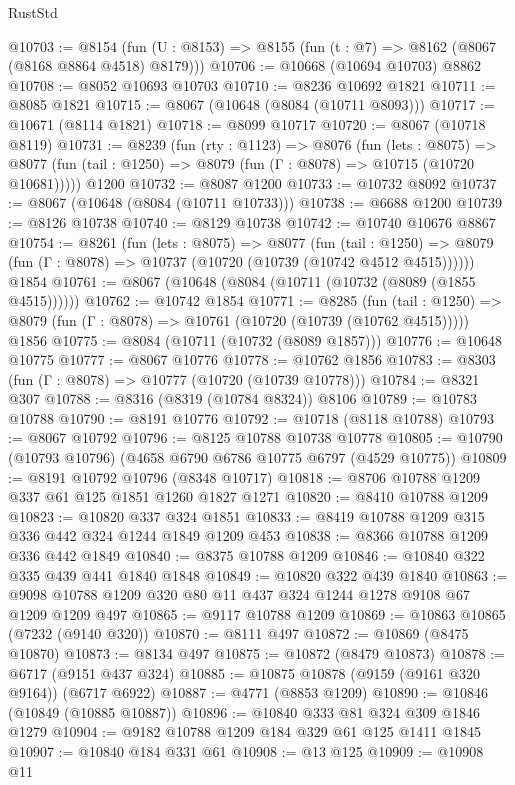 \begin{lexlean}{RustStd}
\begin{coremodule}
@10703 := @8154 (fun (U : @8153) => @8155 (fun (t : @7) => @8162 (@8067 (@8168 @8864 @4518) @8179)))
@10706 := @10668 (@10694 @10703) @8862
@10708 := @8052 @10693 @10703
@10710 := @8236 @10692 @1821
@10711 := @8085 @1821
@10715 := @8067 (@10648 (@8084 (@10711 @8093)))
@10717 := @10671 (@8114 @1821)
@10718 := @8099 @10717
@10720 := @8067 (@10718 @8119)
@10731 := @8239
    (fun (rty : @1123) =>
    @8076
      (fun (lets : @8075) =>
      @8077 (fun (tail : @1250) => @8079 (fun (Γ : @8078) => @10715 (@10720 @10681)))))
    @1200
@10732 := @8087 @1200
@10733 := @10732 @8092
@10737 := @8067 (@10648 (@8084 (@10711 @10733)))
@10738 := @6688 @1200
@10739 := @8126 @10738
@10740 := @8129 @10738
@10742 := @10740 @10676 @8867
@10754 := @8261
    (fun (lets : @8075) =>
    @8077
      (fun (tail : @1250) =>
      @8079 (fun (Γ : @8078) => @10737 (@10720 (@10739 (@10742 @4512 @4515))))))
    @1854
@10761 := @8067 (@10648 (@8084 (@10711 (@10732 (@8089 (@1855 @4515))))))
@10762 := @10742 @1854
@10771 := @8285
    (fun (tail : @1250) => @8079 (fun (Γ : @8078) => @10761 (@10720 (@10739 (@10762 @4515)))))
    @1856
@10775 := @8084 (@10711 (@10732 (@8089 @1857)))
@10776 := @10648 @10775
@10777 := @8067 @10776
@10778 := @10762 @1856
@10783 := @8303 (fun (Γ : @8078) => @10777 (@10720 (@10739 @10778)))
@10784 := @8321 @307
@10788 := @8316 (@8319 (@10784 @8324)) @8106
@10789 := @10783 @10788
@10790 := @8191 @10776
@10792 := @10718 (@8118 @10788)
@10793 := @8067 @10792
@10796 := @8125 @10788 @10738 @10778
@10805 := @10790 (@10793 @10796) (@4658 @6790 @6786 @10775 @6797 (@4529 @10775))
@10809 := @8191 @10792 @10796 (@8348 @10717)
@10818 := @8706 @10788 @1209 @337 @61 @125 @1851 @1260 @1827 @1271
@10820 := @8410 @10788 @1209
@10823 := @10820 @337 @324 @1851
@10833 := @8419 @10788 @1209 @315 @336 @442 @324 @1244 @1849 @1209 @453
@10838 := @8366 @10788 @1209 @336 @442 @1849
@10840 := @8375 @10788 @1209
@10846 := @10840 @322 @335 @439 @441 @1840 @1848
@10849 := @10820 @322 @439 @1840
@10863 := @9098 @10788 @1209 @320 @80 @11 @437 @324 @1244 @1278 @9108 @67 @1209 @1209 @497
@10865 := @9117 @10788 @1209
@10869 := @10863 @10865 (@7232 (@9140 @320))
@10870 := @8111 @497
@10872 := @10869 (@8475 @10870)
@10873 := @8134 @497
@10875 := @10872 (@8479 @10873)
@10878 := @6717 (@9151 @437 @324)
@10885 := @10875 @10878 (@9159 (@9161 @320 @9164)) (@6717 @6922)
@10887 := @4771 (@8853 @1209)
@10890 := @10846 (@10849 (@10885 @10887))
@10896 := @10840 @333 @81 @324 @309 @1846 @1279
@10904 := @9182 @10788 @1209 @184 @329 @61 @125 @1411 @1845
@10907 := @10840 @184 @331 @61
@10908 := @13 @125
@10909 := @10908 @11

\end{coremodule}
\end{lexlean}
